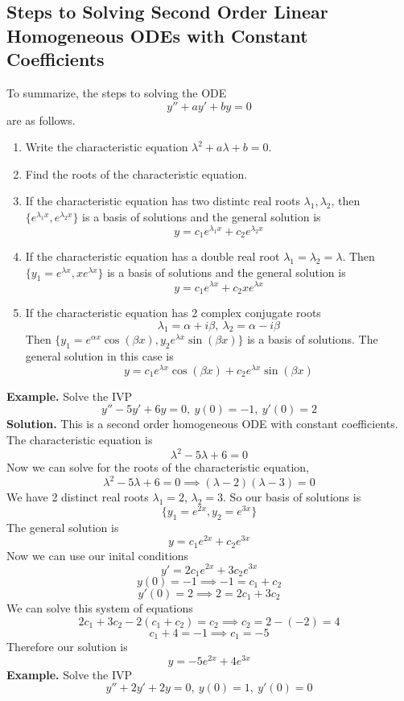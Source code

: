 \documentclass[openany]{report}
\begin{document}
\subsection{Steps to Solving Second Order Linear Homogeneous ODEs with Constant Coefficients}
To summarize, the steps to solving the ODE 
\[y'' + ay' + by = 0\]
are as follows. 
\begin{enumerate}
    \item Write the characteristic equation $\lambda^2 + a\lambda +b = 0$.
    \item Find the roots of the characteristic equation.
    \item If the characteristic equation has two distintc real roots $\lambda_1, \lambda_2$, then $\{e^{\lambda_1x}, e^{\lambda_2x}\}$ is a basis of solutions and the general solution is 
    \[y = c_1e^{\lambda_1x} + c_2e^{\lambda_2x} \]
    \item If the characteristic equation has a double real root $\lambda_1 = \lambda_2 = \lambda$. Then $\{y_1 = e^{\lambda x}, xe^{\lambda x}\}$ is a basis of solutions and the general solution is
    \[y = c_1e^{\lambda x} + c_2xe^{\lambda x}\]
    \item If the characteristic equation has 2 complex conjugate roots 
    \[\lambda_1 = \alpha + i\beta, \ \lambda_2 = \alpha - i\beta\]
    Then $\{y_1 = e^{\alpha x}\cos(\beta x), y_2 e^{\lambda x}\sin(\beta x)\}$ is a basis of solutions. The general solution in this case is 
    \[y = c_1e^{\lambda x}\cos(\beta x)+ c_2e^{\lambda x}\sin(\beta x)\]
\end{enumerate}
\textbf{Example.} Solve the IVP
\[y'' - 5y' + 6y = 0, \ y(0) = -1, \ y'(0) = 2\]
\textbf{Solution.} This is a second order homogeneous ODE with constant coefficients. The characteristic equation is 
\[\lambda^2 - 5\lambda + 6 = 0\]
Now we can solve for the roots of the characteristic equation,
\[\lambda^2 - 5\lambda + 6 = 0 \implies (\lambda -2)(\lambda - 3) = 0\]
We have 2 distinct real roots $\lambda_1 = 2$, $\lambda_2 = 3$. So our basis of solutions is 
\[\{y_1 = e^{2x}, y_2 = e^{3x}\}\]
The general solution is 
\[y = c_1e^{2x} + c_2e^{3x}\]
Now we can use our inital conditions 
\[y' = 2c_1e^{2x}+3c_2e^{3x}\]
\[y(0) = -1 \implies -1 = c_1 + c_2\]
\[y'(0) = 2 \implies 2 = 2c_1 + 3c_2\]
We can solve this system of equations 
\[2c_1 + 3c_2 - 2(c_1 + c_2) = c_2 \implies c_2 = 2 - (-2) = 4\]
\[c_1 + 4 = -1 \implies c_1 = -5\]
Therefore our solution is
\[y = -5e^{2x} + 4e^{3x}\]
\noindent
\textbf{Example.} Solve the IVP 
\[y'' + 2y' + 2y = 0, \ y(0) = 1, \ y'(0) = 0\]
\end{document}
